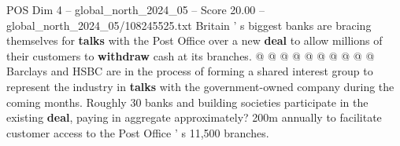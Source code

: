 \begin{textsample}{POS Dim 4 – global\_north\_2024\_05 – Score 20.00 – global\_north\_2024\_05/108245525.txt}
Britain ' s biggest banks are bracing themselves for \textbf{talks} with the Post Office over a new \textbf{deal} to allow millions of their customers to \textbf{withdraw} cash at its branches. @ @ @ @ @ @ @ @ @ @ Barclays and HSBC are in the process of forming a shared interest group to represent the industry in \textbf{talks} with the government-owned company during the coming months.
Roughly 30 banks and building societies participate in the existing \textbf{deal}, paying in aggregate approximately? 200m annually to facilitate customer access to the Post Office ' s 11,500 branches.

\end{textsample}
